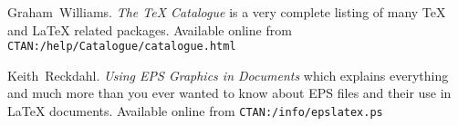 \begin{thebibliography}{99}
 Graham~Williams.  \newblock \emph{The TeX
    Catalogue} is a very complete listing of many \TeX{} and \LaTeX{}
    related packages.
  \newblock Available online from \texttt{CTAN:/help/Catalogue/catalogue.html}
  
 Keith~Reckdahl.  \newblock \emph{Using EPS Graphics in
    \LaTeXe{} Documents} which explains everything and much more than
  you ever wanted to know about EPS files and their use in \LaTeX{}
  documents.  \newblock Available online from
  \texttt{CTAN:/info/epslatex.ps}

\end{thebibliography}


